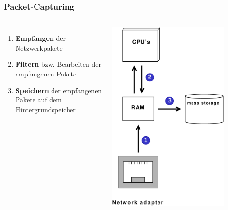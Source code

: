 \documentclass{beamer}
\begin{document}
\begin{frame}
\frametitle{Packet-Capturing}
\begin{columns}
\vspace{-15em}
\begin{enumerate}
	\item \textbf{Empfangen} der Netzwerkpakete \newline
	\item \textbf{Filtern} bzw. Bearbeiten der empfangenen Pakete \newline
	\item \textbf{Speichern} der empfangenen Pakete auf dem Hintergrundspeicher
\end{enumerate}
\includegraphics [width=0.82\textwidth, keepaspectratio]{pics/HardwareView}
\end{columns}
\end{frame}
\end{document}
